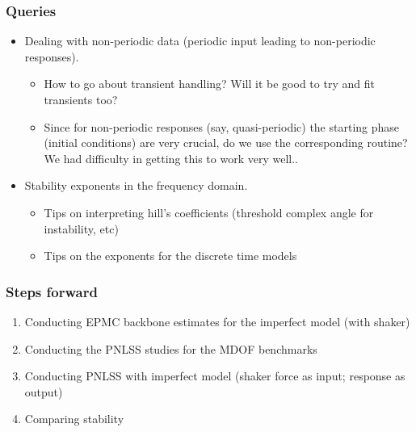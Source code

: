 \documentclass[aspectratio=169]{beamer}
\begin{document}
\begin{frame}
  \frametitle{Queries}
  \begin{itemize}
  \item Dealing with non-periodic data (periodic input leading to
    non-periodic responses).
    \begin{itemize}
    \item How to go about transient handling? Will it be good to try
      and fit transients too?
    \item Since for non-periodic responses (say, quasi-periodic) the
      starting phase (initial conditions) are very crucial, do we use
      the corresponding routine? We had difficulty in getting this to
      work very well..
    \end{itemize}
  \item Stability exponents in the frequency domain.
    \begin{itemize}
    \item Tips on interpreting hill's coefficients (threshold complex
      angle for instability, etc)
    \item Tips on the exponents for the discrete time models
    \end{itemize}
  \end{itemize}
\end{frame}

\begin{frame}
  \frametitle{Steps forward}
  \begin{enumerate}
  \item Conducting EPMC backbone estimates for the imperfect model (with shaker)
  \item Conducting the PNLSS studies for the MDOF benchmarks
  \item Conducting PNLSS with imperfect model (shaker force as input;
    response as output)
  \item Comparing stability 
  \end{enumerate}
\end{frame}
\end{document}
